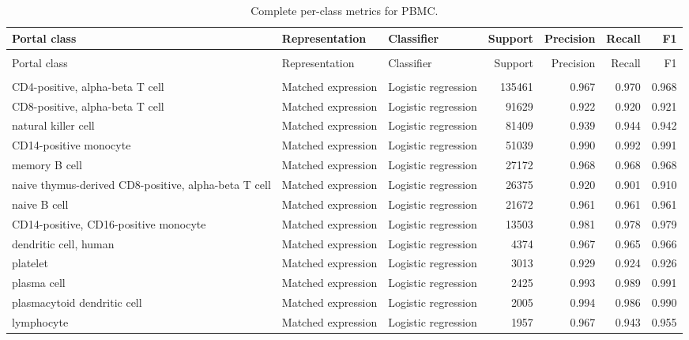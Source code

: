 {\footnotesize\setlength{\tabcolsep}{3pt}
\begin{longtable}{>{\raggedright\arraybackslash}p{4.2cm}llrrrr}
\caption{Complete per-class metrics for PBMC.}\label{tab:s-perclass-pbmc}\\
\toprule
Portal class & Representation & Classifier & Support & Precision & Recall & F1 \\
\midrule
\endfirsthead
\multicolumn{7}{c}{\tablename\ \thetable{} continued}\\
\toprule
Portal class & Representation & Classifier & Support & Precision & Recall & F1 \\
\midrule
\endhead
\midrule
\multicolumn{7}{r}{Continued on next page}\\
\endfoot
\bottomrule
\endlastfoot
CD4-positive, alpha-beta T cell & Matched expression & Logistic regression & 135461 & 0.967 & 0.970 & 0.968 \\
CD8-positive, alpha-beta T cell & Matched expression & Logistic regression & 91629 & 0.922 & 0.920 & 0.921 \\
natural killer cell & Matched expression & Logistic regression & 81409 & 0.939 & 0.944 & 0.942 \\
CD14-positive monocyte & Matched expression & Logistic regression & 51039 & 0.990 & 0.992 & 0.991 \\
memory B cell & Matched expression & Logistic regression & 27172 & 0.968 & 0.968 & 0.968 \\
naive thymus-derived CD8-positive, alpha-beta T cell & Matched expression & Logistic regression & 26375 & 0.920 & 0.901 & 0.910 \\
naive B cell & Matched expression & Logistic regression & 21672 & 0.961 & 0.961 & 0.961 \\
CD14-positive, CD16-positive monocyte & Matched expression & Logistic regression & 13503 & 0.981 & 0.978 & 0.979 \\
dendritic cell, human & Matched expression & Logistic regression & 4374 & 0.967 & 0.965 & 0.966 \\
platelet & Matched expression & Logistic regression & 3013 & 0.929 & 0.924 & 0.926 \\
plasma cell & Matched expression & Logistic regression & 2425 & 0.993 & 0.989 & 0.991 \\
plasmacytoid dendritic cell & Matched expression & Logistic regression & 2005 & 0.994 & 0.986 & 0.990 \\
lymphocyte & Matched expression & Logistic regression & 1957 & 0.967 & 0.943 & 0.955 \\

\end{longtable}}
